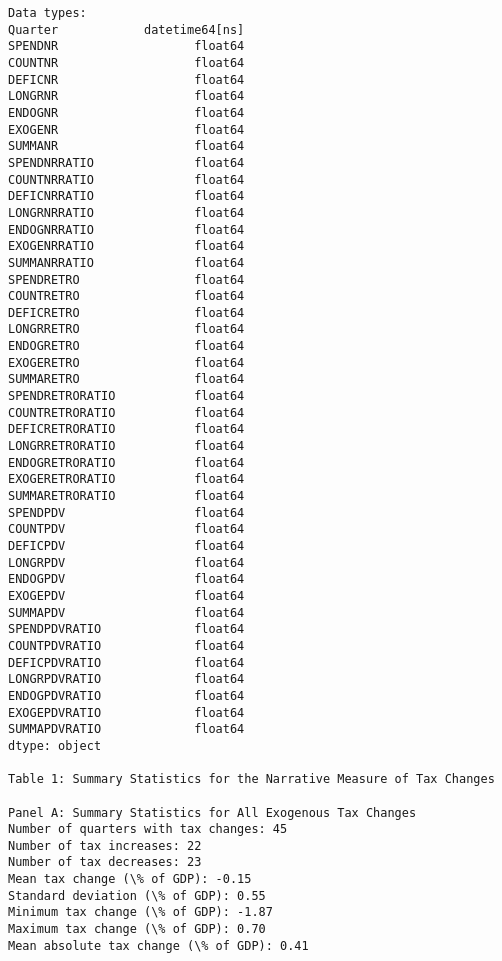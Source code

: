 \documentclass[11pt]{article}
\begin{document}
\begin{Verbatim}[commandchars=\\\{\}]
Data types:
Quarter            datetime64[ns]
SPENDNR                   float64
COUNTNR                   float64
DEFICNR                   float64
LONGRNR                   float64
ENDOGNR                   float64
EXOGENR                   float64
SUMMANR                   float64
SPENDNRRATIO              float64
COUNTNRRATIO              float64
DEFICNRRATIO              float64
LONGRNRRATIO              float64
ENDOGNRRATIO              float64
EXOGENRRATIO              float64
SUMMANRRATIO              float64
SPENDRETRO                float64
COUNTRETRO                float64
DEFICRETRO                float64
LONGRRETRO                float64
ENDOGRETRO                float64
EXOGERETRO                float64
SUMMARETRO                float64
SPENDRETRORATIO           float64
COUNTRETRORATIO           float64
DEFICRETRORATIO           float64
LONGRRETRORATIO           float64
ENDOGRETRORATIO           float64
EXOGERETRORATIO           float64
SUMMARETRORATIO           float64
SPENDPDV                  float64
COUNTPDV                  float64
DEFICPDV                  float64
LONGRPDV                  float64
ENDOGPDV                  float64
EXOGEPDV                  float64
SUMMAPDV                  float64
SPENDPDVRATIO             float64
COUNTPDVRATIO             float64
DEFICPDVRATIO             float64
LONGRPDVRATIO             float64
ENDOGPDVRATIO             float64
EXOGEPDVRATIO             float64
SUMMAPDVRATIO             float64
dtype: object

Table 1: Summary Statistics for the Narrative Measure of Tax Changes

Panel A: Summary Statistics for All Exogenous Tax Changes
Number of quarters with tax changes: 45
Number of tax increases: 22
Number of tax decreases: 23
Mean tax change (\% of GDP): -0.15
Standard deviation (\% of GDP): 0.55
Minimum tax change (\% of GDP): -1.87
Maximum tax change (\% of GDP): 0.70
Mean absolute tax change (\% of GDP): 0.41
    \end{Verbatim}
\end{document}
